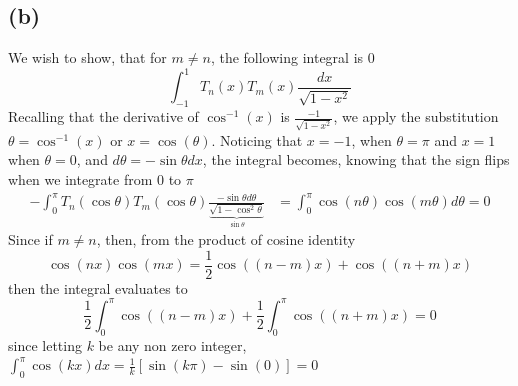 \documentclass[12pt]{article}
\begin{document}
\subsection*{(b)}
We wish to show, that for $m \neq n$, the following integral is 0
$$\int_{-1}^1 T_n(x)T_m(x) \frac{dx}{\sqrt{1-x^2}}$$
Recalling that the derivative of $\cos^{-1}(x)$ is $ \frac{-1}{\sqrt{1-x^2}}$, we apply the substitution $\theta = \cos^{-1}(x)$ or $x = \cos(\theta)$. Noticing that $x = -1$, when $\theta = \pi$ and $x = 1$ when $\theta = 0$, and $d\theta = -\sin\theta  dx$, the integral becomes, knowing that the sign flips when we integrate from $0$ to $\pi$
\begin{align*}
-\int_{0}^\pi T_n(\cos\theta) T_m(\cos\theta) \frac{-\sin\theta d\theta}{\underbrace{\sqrt{1-\cos^2\theta}}_{\sin\theta}} &= \int_{0}^\pi \cos(n\theta)\cos(m\theta) d\theta = 0
\end{align*} 
Since if $m \neq n$, 
then, from the product of cosine identity
$$\cos(nx) \cos(mx) = \frac{1}{2} \cos((n-m)x) + \cos((n+m)x)$$ 
then the integral evaluates to 
$$ \frac{1}{2} \int_0^\pi \cos((n-m)x) + \frac{1}{2} \int_0^\pi \cos((n+m)x) = 0$$
since letting $k$ be any non zero integer,
$\int_{0}^\pi \cos(kx)dx = \frac{1}{k} [ \sin(k\pi) - \sin(0)] = 0$
\end{document}
